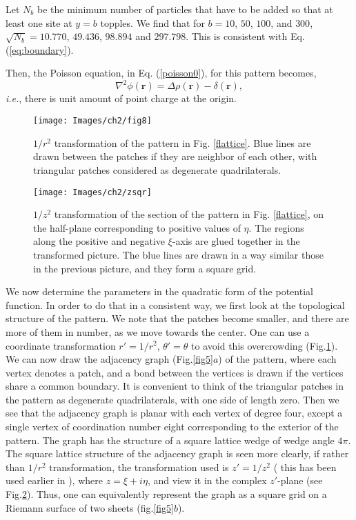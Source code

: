 \documentclass[11pt,a4paper]{book}
\begin{document}
Let $N_b$ be the minimum number of particles that have to be added so
that at least one site at $y=b$ topples. We find that for $b=10$,
$50$, $100$, and $300$, $\sqrt{N_b}=10.770$, $49.436$, $98.894$ and
$297.798$.
This is consistent with Eq. (\ref{eq:boundary}).

Then, the Poisson equation, in Eq. (\ref{poisson0}), for this pattern becomes,
\begin{equation}
\nabla^{2}\phi\left( \mathbf{r} \right)=\Delta\rho\left( \mathbf{r}
\right)-\delta\left( \mathbf{r} \right),
\label{poisson1}
\end{equation}
\textit{i.e.}, there is unit amount of point charge at the origin.

\begin{figure}
 \begin{center}
 \texttt{[image: Images/ch2/fig8]}
 \caption{$1/r^2$ transformation of the pattern in Fig. \ref{flattice}. Blue lines
are drawn between the patches if they are neighbor of each other, with triangular patches 
considered as degenerate quadrilaterals.}
 \label{adj}
 \end{center}
\end{figure}
\begin{figure}
 \begin{center}
 \texttt{[image: Images/ch2/zsqr]}
 \caption{$1/z^2$ transformation of the section of the pattern in Fig.
\ref{flattice}, on the half-plane corresponding to positive values of
$\eta$. The regions along the positive and negative $\xi$-axis are glued together in the
transformed picture. The blue lines are drawn in a way similar those in the
previous picture, and they form a square grid.}
 \label{zsqr}
 \end{center}
\end{figure}
We now determine the parameters in the quadratic form of the potential
function. In order to do that in a consistent way, we first
look at the topological structure of the pattern. We note 
that the patches become smaller, and there are more of them in number, as 
we move towards the center. One can use a coordinate
transformation $r'= 1/r^2$,  $\theta' =\theta$ to avoid this 
overcrowding (Fig.\ref{adj}). We can now draw the  adjacency graph (Fig.\ref{fig5}$a$) 
of the pattern, where each vertex 
denotes a patch, and a bond between the vertices is drawn if the 
vertices share a common boundary. It is convenient to think of the 
triangular patches in the pattern as degenerate quadrilaterals, with one 
side of length zero. Then we see that the adjacency graph is planar with 
each vertex of degree four, except a single vertex of coordination 
number eight corresponding to the exterior of the pattern. The graph has 
the structure of a square lattice wedge of wedge angle $4\pi$. The 
square lattice structure of the adjacency graph is seen more clearly, if 
rather than $1/r^2$ transformation, the transformation used is  $z' = 1/z^2$  ( 
this has been used earlier in 
\cite{ostojic}), where $z=\xi+ i \eta$, and view it in the complex 
$z'$-plane (see Fig.\ref{zsqr}). Thus, one can equivalently represent the graph as a square 
grid on a Riemann surface of two sheets (fig.\ref{fig5}$b$).
\end{document}
